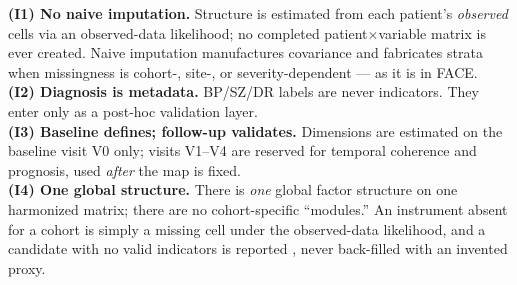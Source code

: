 \begin{invariantbox}
\textbf{(I1) No naive imputation.} Structure is estimated from each patient's \emph{observed} cells via an
observed-data likelihood; no completed patient$\times$variable matrix is ever created. Naive imputation
manufactures covariance and fabricates strata when missingness is cohort-, site-, or severity-dependent --- as
it is in FACE.\\[3pt]
\textbf{(I2) Diagnosis is metadata.} BP/SZ/DR labels are never indicators. They enter only as a post-hoc validation layer.\\[3pt]
\textbf{(I3) Baseline defines; follow-up validates.} Dimensions are estimated on the baseline visit V0 only;
visits V1--V4 are reserved for temporal coherence and prognosis, used \emph{after} the map is fixed.\\[3pt]
\textbf{(I4) One global structure.} There is \emph{one} global factor structure on one harmonized matrix;
there are no cohort-specific ``modules.'' An instrument absent for a cohort is simply a missing cell under the
observed-data likelihood, and a candidate with no valid indicators is reported , never
back-filled with an invented proxy.
\end{invariantbox}

